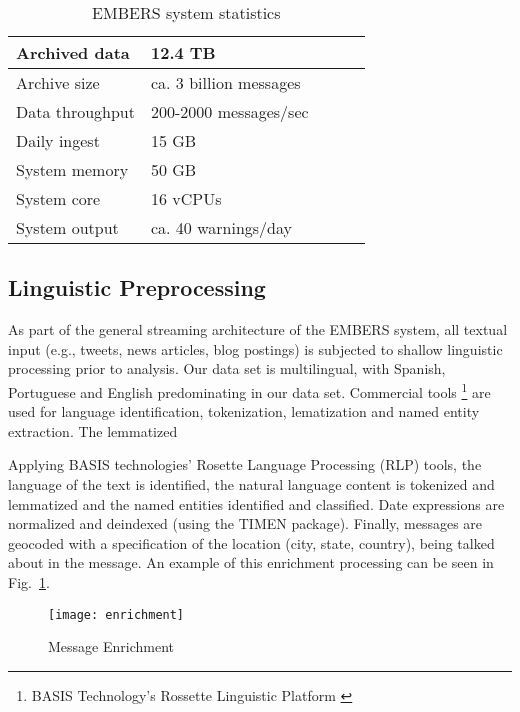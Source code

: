 
\begin{table}
\caption{EMBERS system statistics}
 \centering
 \begin{tabular}{|l|l|l|l|l|}
 \hline
 Archived data     & 12.4 TB                  \\ \hline
 Archive size & ca. 3 billion messages   \\ \hline
 Data throughput   & 200-2000 messages/sec  \\ \hline
 Daily ingest & 15 GB \\ \hline
 System memory & 50 GB \\ \hline
 System core & 16 vCPUs \\ \hline
 System output & ca. 40 warnings/day \\ \hline
\end{tabular}
\label{tab:stats}
\end{table}



\subsection{Linguistic Preprocessing}

As part of the general streaming architecture of the EMBERS system,
all textual input (e.g., tweets, news articles, blog postings) is
subjected to shallow linguistic processing prior to analysis.  Our
data set is multilingual, with Spanish, Portuguese and English
predominating in our data set. Commercial tools \footnote{BASIS
  Technology's Rossette Linguistic Platform \cite{}} are used for language
identification, tokenization, lematization and named entity
extraction. The lemmatized

Applying BASIS
technologies' Rosette Language Processing (RLP) tools, the language of
the text is identified, the natural language content is tokenized and
lemmatized and the named entities identified and classified. Date
expressions are normalized and deindexed (using the TIMEN
\cite{LlorensDGS12} package).  Finally, messages are geocoded with a
specification of the location (city, state, country), being talked
about in the message.  An example of this enrichment processing can be
seen in Fig.~\ref{fig:enrichment}.

\begin{figure}
    \texttt{[image: enrichment]}
    \caption{Message Enrichment}
    \label{fig:enrichment}
\end{figure}



